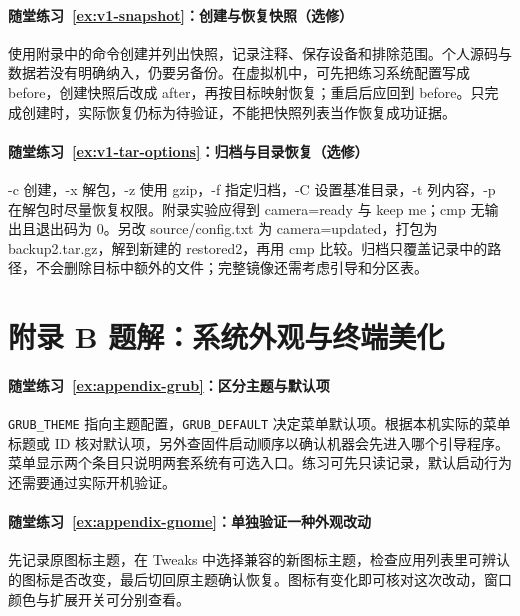 \paragraph*{随堂练习~\ref{ex:v1-snapshot}：创建与恢复快照（选修）}
\begin{solution}
使用附录中的命令创建并列出快照，记录注释、保存设备和排除范围。个人源码与数据若没有明确纳入，仍要另备份。在虚拟机中，可先把练习系统配置写成 before，创建快照后改成 after，再按目标映射恢复；重启后应回到 before。只完成创建时，实际恢复仍标为待验证，不能把快照列表当作恢复成功证据。
\end{solution}

\paragraph*{随堂练习~\ref{ex:v1-tar-options}：归档与目录恢复（选修）}
\begin{solution}
-c 创建，-x 解包，-z 使用 gzip，-f 指定归档，-C 设置基准目录，-t 列内容，-p 在解包时尽量恢复权限。附录实验应得到 camera=ready 与 keep me；cmp 无输出且退出码为 0。另改 source/config.txt 为 camera=updated，打包为 backup2.tar.gz，解到新建的 restored2，再用 cmp 比较。归档只覆盖记录中的路径，不会删除目标中额外的文件；完整镜像还需考虑引导和分区表。
\end{solution}

\section*{附录 B 题解：系统外观与终端美化}
{}

\paragraph*{随堂练习~\ref{ex:appendix-grub}：区分主题与默认项}
\begin{solution}
\texttt{GRUB\_THEME} 指向主题配置，\texttt{GRUB\_DEFAULT} 决定菜单默认项。根据本机实际的菜单标题或 ID 核对默认项，另外查固件启动顺序以确认机器会先进入哪个引导程序。菜单显示两个条目只说明两套系统有可选入口。练习可先只读记录，默认启动行为还需要通过实际开机验证。
\end{solution}

\paragraph*{随堂练习~\ref{ex:appendix-gnome}：单独验证一种外观改动}
\begin{solution}
先记录原图标主题，在 Tweaks 中选择兼容的新图标主题，检查应用列表里可辨认的图标是否改变，最后切回原主题确认恢复。图标有变化即可核对这次改动，窗口颜色与扩展开关可分别查看。
\end{solution}

